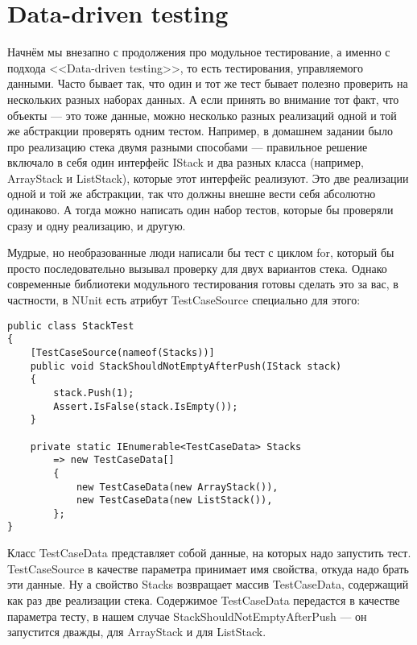 \documentclass{../../text-style}
\begin{document}
\maketitle
\thispagestyle{empty}

\section{Data-driven testing}

Начнём мы внезапно с продолжения про модульное тестирование, а именно с подхода <<Data-driven testing>>, то есть тестирования, управляемого данными. Часто бывает так, что один и тот же тест бывает полезно проверить на нескольких разных наборах данных. А если принять во внимание тот факт, что объекты --- это тоже данные, можно несколько разных реализаций одной и той же абстракции проверять одним тестом. Например, в домашнем задании было про реализацию стека двумя разными способами --- правильное решение включало в себя один интерфейс IStack и два разных класса (например, ArrayStack и ListStack), которые этот интерфейс реализуют. Это две реализации одной и той же абстракции, так что должны внешне вести себя абсолютно одинаково. А тогда можно написать один набор тестов, которые бы проверяли сразу и одну реализацию, и другую.

Мудрые, но необразованные люди написали бы тест с циклом for, который бы просто последовательно вызывал проверку для двух вариантов стека. Однако современные библиотеки модульного тестирования готовы сделать это за вас, в частности, в NUnit есть атрибут TestCaseSource специально для этого:

\begin{verbatim}
public class StackTest
{
    [TestCaseSource(nameof(Stacks))]
    public void StackShouldNotEmptyAfterPush(IStack stack)
    {
        stack.Push(1);
        Assert.IsFalse(stack.IsEmpty());
    }

    private static IEnumerable<TestCaseData> Stacks
        => new TestCaseData[]
        {
            new TestCaseData(new ArrayStack()),
            new TestCaseData(new ListStack()),
        };
}
\end{verbatim}

Класс TestCaseData представляет собой данные, на которых надо запустить тест. TestCaseSource в качестве параметра принимает имя свойства, откуда надо брать эти данные. Ну а свойство Stacks возвращает массив TestCaseData, содержащий как раз две реализации стека. Содержимое TestCaseData передастся в качестве параметра тесту, в нашем случае StackShouldNotEmptyAfterPush --- он запустится дважды, для ArrayStack и для ListStack.
\end{document}
